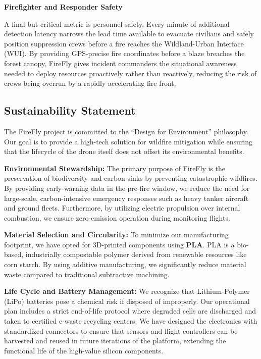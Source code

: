 \documentclass[journal, onecolumn]{IEEEtran}
\begin{document}
\vspace{1em}

\textbf{Firefighter and Responder Safety}

A final but critical metric is personnel safety. Every minute of additional
detection latency narrows the lead time available to evacuate civilians and
safely position suppression crews before a fire reaches the Wildland-Urban
Interface (WUI). By providing GPS-precise fire coordinates
before a blaze breaches the forest canopy, FireFly gives incident
commanders the situational awareness needed to deploy resources
proactively rather than reactively, reducing the risk of crews being
overrun by a rapidly accelerating fire front.

\subsection{Sustainability Statement}

The FireFly project is committed to the ``Design for Environment'' philosophy. Our goal is to provide a high-tech solution for wildfire mitigation while ensuring that the lifecycle of the drone itself does not offset its environmental benefits.

\vspace{1em}

\textbf{Environmental Stewardship:}
The primary purpose of FireFly is the preservation of biodiversity and carbon sinks by preventing catastrophic wildfires. By providing early-warning data in the pre-fire window, we reduce the need for large-scale, carbon-intensive emergency responses such as heavy tanker aircraft and ground fleets. Furthermore, by utilizing electric propulsion over internal combustion, we ensure zero-emission operation during monitoring flights.

\vspace{1em}

\textbf{Material Selection and Circularity:}
To minimize our manufacturing footprint, we have opted for 3D-printed components using \textbf{PLA}. PLA is a bio-based, industrially compostable polymer derived from renewable resources like corn starch. By using additive manufacturing, we significantly reduce material waste compared to traditional subtractive machining.

\vspace{1em}

\textbf{Life Cycle and Battery Management:}
We recognize that Lithium-Polymer (LiPo) batteries pose a chemical risk if disposed of improperly. Our operational plan includes a strict end-of-life protocol where degraded cells are discharged and taken to certified e-waste recycling centers. We have designed the electronics with standardized connectors to ensure that sensors and flight controllers can be harvested and reused in future iterations of the platform, extending the functional life of the high-value silicon components.
\end{document}
